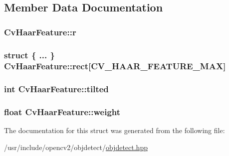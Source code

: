 \subsection{Member Data Documentation}
\hypertarget{structCvHaarFeature_a8e045f727beedf2d052ad1a60acb6026}{
\subsubsection[{r}]{ Cv\-Haar\-Feature\-::r}}\label{structCvHaarFeature_a8e045f727beedf2d052ad1a60acb6026}
\hypertarget{structCvHaarFeature_af002d639b8cee0fc1fbdcfbab0aaddc1}{
\subsubsection[{rect}]{\setlength{\rightskip}{0pt plus 5cm}struct \{ ... \}   Cv\-Haar\-Feature\-::rect\mbox{[}{\bf C\-V\-\_\-\-H\-A\-A\-R\-\_\-\-F\-E\-A\-T\-U\-R\-E\-\_\-\-M\-A\-X}\mbox{]}}}\label{structCvHaarFeature_af002d639b8cee0fc1fbdcfbab0aaddc1}
\hypertarget{structCvHaarFeature_a8640a958583ac7462cbef6d818025646}{
\subsubsection[{tilted}]{\setlength{\rightskip}{0pt plus 5cm}int Cv\-Haar\-Feature\-::tilted}}\label{structCvHaarFeature_a8640a958583ac7462cbef6d818025646}
\hypertarget{structCvHaarFeature_a7b402c0924b72d0b4012223a52ca97ab}{
\subsubsection[{weight}]{\setlength{\rightskip}{0pt plus 5cm}float Cv\-Haar\-Feature\-::weight}}\label{structCvHaarFeature_a7b402c0924b72d0b4012223a52ca97ab}


The documentation for this struct was generated from the following file\-:\begin{DoxyCompactItemize}
\item 
/usr/include/opencv2/objdetect/\hyperlink{objdetect_8hpp}{objdetect.\-hpp}\end{DoxyCompactItemize}

